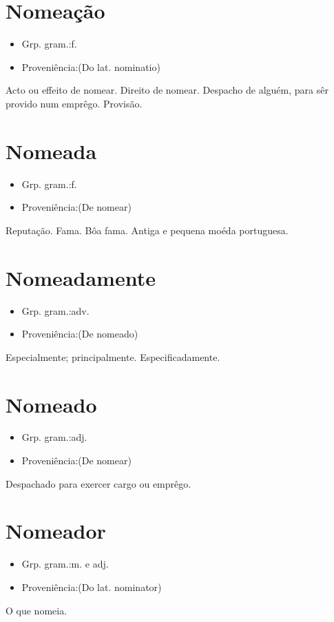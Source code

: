 \section{Nomeação}
\begin{itemize}
\item {Grp. gram.:f.}
\end{itemize}
\begin{itemize}
\item {Proveniência:(Do lat. \textunderscore nominatio\textunderscore )}
\end{itemize}
Acto ou effeito de nomear.
Direito de nomear.
Despacho de alguém, para sêr provido num emprêgo.
Provisão.
\section{Nomeada}
\begin{itemize}
\item {Grp. gram.:f.}
\end{itemize}
\begin{itemize}
\item {Proveniência:(De \textunderscore nomear\textunderscore )}
\end{itemize}
Reputação.
Fama.
Bôa fama.
Antiga e pequena moéda portuguesa.
\section{Nomeadamente}
\begin{itemize}
\item {Grp. gram.:adv.}
\end{itemize}
\begin{itemize}
\item {Proveniência:(De \textunderscore nomeado\textunderscore )}
\end{itemize}
Especialmente; principalmente.
Especificadamente.
\section{Nomeado}
\begin{itemize}
\item {Grp. gram.:adj.}
\end{itemize}
\begin{itemize}
\item {Proveniência:(De \textunderscore nomear\textunderscore )}
\end{itemize}
Despachado para exercer cargo ou emprêgo.
\section{Nomeador}
\begin{itemize}
\item {Grp. gram.:m.  e  adj.}
\end{itemize}
\begin{itemize}
\item {Proveniência:(Do lat. \textunderscore nominator\textunderscore )}
\end{itemize}
O que nomeia.
